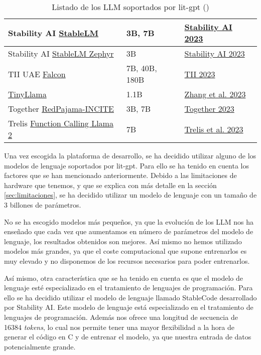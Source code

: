\begin{table}[H]
{\begin{tabular}{|l|l|l|}
        \hline
        Stability AI \href{tutorials/download_stablelm.md}{StableLM} & 3B, 7B & \href{https://github.com/Stability-AI/StableLM}{Stability AI 2023} \\
        \hline
        Stability AI \href{tutorials/download_stablelm.md}{StableLM Zephyr} & 3B & \href{https://stability.ai/blog/stablecode-llm-generative-ai-coding}{Stability AI 2023} \\
        \hline
        TII UAE \href{tutorials/download_falcon.md}{Falcon} & 7B, 40B, 180B & \href{https://falconllm.tii.ae}{TII 2023} \\
        \hline
        \href{tutorials/download_tinyllama.md}{TinyLlama} & 1.1B & \href{https://github.com/jzhang38/TinyLlama}{Zhang et al. 2023} \\
        \hline
        Together \href{tutorials/download_redpajama_incite.md}{RedPajama-INCITE} & 3B, 7B & \href{https://together.ai/blog/redpajama-models-v1}{Together 2023} \\
        \hline
        Trelis \href{tutorials/download_function_calling_llama_2.md}{Function Calling Llama 2} & 7B & \href{https://huggingface.co/Trelis/Llama-2-7b-chat-hf-function-calling-v2}{Trelis et al. 2023} \\
        \hline
    \end{tabular}%
    }
    \caption[Listado de los LLM soportados por lit-gpt]{Listado de los LLM soportados por lit-gpt (\cite{litGPT})}
    \label{tab:litGPT}
\end{table}

Una vez escogida la plataforma de desarrollo, se ha decidido utilizar alguno de los
modelos de lenguaje soportados por lit-gpt. Para ello se ha tenido en cuenta los
factores que se han mencionado anteriormente. Debido a las limitaciones de hardware
que tenemos, y que se explica con más detalle en la sección \ref{sec:limitaciones},
se ha decidido utilizar un modelo de lenguaje con un tamaño de 3 billones de parámetros.

No se ha escogido modelos más pequeños, ya que la evolución de los LLM nos ha enseñado
que cada vez que aumentamos en número de parámetros del modelo de lenguaje, los resultados
obtenidos son mejores. Así mismo no hemos utilizado modelos más grandes, ya que el coste
computacional que supone entrenarlos es muy elevado y no disponemos de los recursos
necesarios para poder entrenarlos.

Así mismo, otra característica que se ha tenido en cuenta es que el modelo de lenguaje
esté especializado en el tratamiento de lenguajes de programación. Para ello se ha
decidido utilizar el modelo de lenguaje llamado StableCode\cite{StableCode} desarrollado
por Stability AI. Este modelo de lenguaje está especializado en el tratamiento de lenguajes
de programación. Además nos ofrece una longitud de secuencia de 16384 \textit{tokens}, lo cual
nos permite tener una mayor flexibilidad a la hora de generar el código en C y de entrenar
el modelo, ya que nuestra entrada de datos potencialmente grande.

